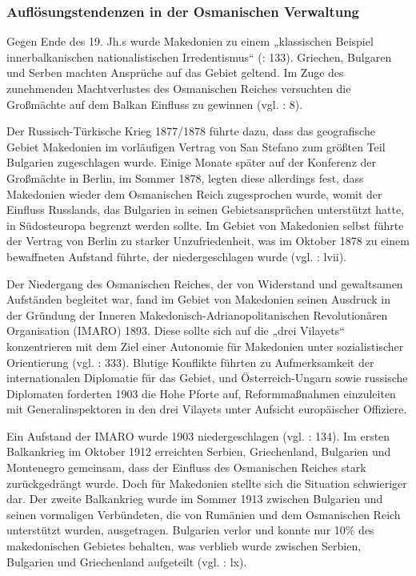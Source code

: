 \subsubsection{Auflösungstendenzen in der Osmanischen Verwaltung}	
Gegen Ende des 19. Jh.s wurde Makedonien zu einem „klassischen Beispiel innerbalkanischen nationalistischen Irredentismus“ (\cite{tzermisa}: 133). Griechen, Bulgaren und Serben machten Ansprüche auf das Gebiet geltend. Im Zuge des zunehmenden Machtverlustes des Osmanischen Reiches versuchten die Großmächte auf dem Balkan Einfluss zu gewinnen (vgl. \cite{bark01}: 8).
\par
Der Russisch-Türkische Krieg 1877/1878 führte dazu, dass das geografische Gebiet Makedonien im vorläufigen Vertrag von San Stefano zum größten Teil Bulgarien zugeschlagen wurde. Einige Monate später auf der Konferenz der Großmächte in Berlin, im Sommer 1878, legten diese allerdings fest, dass Makedonien wieder dem Osmanischen Reich zugesprochen wurde, womit der Einfluss Russlands, das Bulgarien in seinen Gebietsansprüchen unterstützt hatte, in Südosteuropa begrenzt werden sollte. Im Gebiet von Makedonien selbst führte der Vertrag von Berlin zu starker Unzufriedenheit, was im Oktober 1878 zu einem bewaffneten Aufstand führte, der niedergeschlagen wurde (vgl. \cite{bech09}:  lvii).\par
Der Niedergang des Osmanischen Reiches, der von Widerstand und gewaltsamen Aufständen begleitet war, fand im Gebiet von Makedonien seinen Ausdruck in der Gründung der Inneren Makedonisch-Adrianopolitanischen Revolutionären Organisation (IMARO) 1893. Diese sollte sich auf die „drei Vilayets“ konzentrieren mit dem Ziel einer Autonomie für Makedonien unter sozialistischer Orientierung (vgl. \cite{boeck}: 333). Blutige Konflikte führten zu Aufmerksamkeit der internationalen Diplomatie für das Gebiet, und Österreich-Ungarn sowie russische Diplomaten forderten 1903 die Hohe Pforte auf, Reformmaßnahmen einzuleiten mit Generalinspektoren in den drei Vilayets unter Aufsicht europäischer Offiziere.\par
 Ein Aufstand der IMARO wurde 1903 niedergeschlagen (vgl. \cite{tzermisa}: 134). Im ersten Balkankrieg im Oktober 1912 erreichten Serbien, Griechenland, Bulgarien und Montenegro gemeinsam, dass der Einfluss des Osmanischen Reiches stark zurückgedrängt wurde. Doch für Makedonien stellte sich die Situation schwieriger dar. Der zweite Balkankrieg wurde im Sommer 1913 zwischen Bulgarien und seinen vormaligen Verbündeten, die von Rumänien und dem Osmanischen Reich unterstützt wurden, ausgetragen. Bulgarien verlor und konnte nur 10\% des makedonischen Gebietes behalten, was verblieb wurde zwischen Serbien, Bulgarien und Griechenland aufgeteilt (vgl. \cite{bech09}: lx).\par
